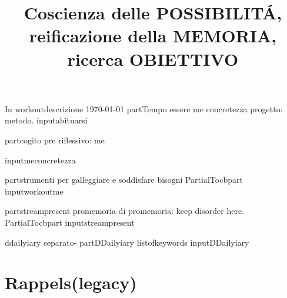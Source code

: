 \documentclass[oneside,20pt,fleqn,extrafontsizes]{memoir}
\title{Coscienza delle POSSIBILIT\'A, reificazione della MEMORIA, ricerca OBIETTIVO}
\begin{document}

\pagestyle{mystyle}%


\renewcommand*{\contentsname}{\hypertarget{toc}{Table of Contents}}%

In workoutdescrizione
{\let\clearpage\relax
\today
part{Tempo essere me concretezza progetto: metodo.}
}
input{abituarsi}

\tableofcontents*

{%
\let\clearpage\relax%
\maketitle%
part{cogito pre riflessivo: me}%
}%
input{meconcretezza}


part{strumenti per galleggiare e soddisfare bisogni}
PartialTocbpart
input{workoutme}

part{streampresent promemoria di promemoria: keep disorder here.}
PartialTocbpart
input{streampresent}

ddailyiary separato-
part{DDailyiary}
listofkeywords
input{DDailyiary}
\clearpage

\part{Rappels(legacy)}
\PartialTocbpart


\clearpage

\stopcontents[chapters]
\end{document}
